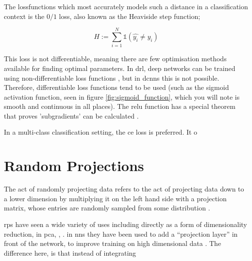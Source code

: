 The \gls{lossfunction}s which most accurately models such a distance in a classification context is the $0/1$ loss, also known as the Heaviside step function;

\begin{equation}
H := \sum_{i = 1}^N \mathds{1} (\hat{y_i} \neq y_i)  
\end{equation}

This loss is not differentiable, meaning there are few optimisation methods available for finding optimal parameters. In \gls{drl}, deep networks can be trained using non-differentiable loss functions \cite{drl_non_differentiable}, but in \gls{dcnn}s this is not possible. Therefore, differentiable loss functions tend to be used (such as the sigmoid activation function, seen in figure \ref{fig:sigmoid_function}, which you will note is smooth and continuous in all places). The \gls{relu} function has a special theorem that proves 'subgradients' can be calculated \cite{subgradient_theorem}.
\bigskip

In a multi-class classification setting, the \gls{ce} loss is preferred. It o

%
%
%

\section{Random Projections}

The act of randomly projecting data refers to the act of projecting data down to a lower dimension by multiplying it on the left hand side with a projection matrix, whose entries are randomly sampled from some distribution \cite{bob_learning_high_dim}.



\gls{rp}s have seen a wide variety of uses \cite{random_project_uses} including directly as a form of dimensionality reduction, in \gls{pca},  %
, . in \gls{nn}s they have been used to add a \enquote{projection layer} in front of the network, to improve training on high dimensional data \cite{random_project_high_d}. The difference here, is that instead of integrating 

